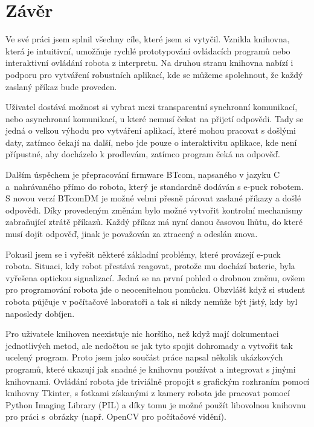 \chapter*{Závěr}

    Ve své práci jsem splnil všechny cíle, které jsem si vytyčil. Vznikla
    knihovna, která je intuitivní, umožňuje rychlé prototypování ovládacích
    programů nebo interaktivní ovládání robota z interpretu. Na druhou stranu
    knihovna nabízí i podporu pro vytváření robustních aplikací, kde se můžeme
    spolehnout, že každý zaslaný příkaz bude proveden.

    Uživatel dostává možnost si vybrat mezi transparentní synchronní
    komunikací, nebo asynchronní komunikací, u které nemusí čekat na přijetí
    odpovědi. Tady se jedná o velkou výhodu pro vytváření aplikací, které mohou
    pracovat s došlými daty, zatímco čekají na další, nebo jde pouze o
    interaktivitu aplikace, kde není přípustné, aby docházelo k prodlevám,
    zatímco program čeká na odpověď.

    Dalším úspěchem je přepracování firmware BTcom, napsaného v jazyku C
    a~nahrávaného přímo do robota, který je standardně dodáván s e-puck
    robotem. S novou verzí BTcomDM je možné velmi přesně párovat zaslané
    příkazy a došlé odpovědi. Díky provedeným změnám bylo možné vytvořit
    kontrolní mechanismy zabraňující ztrátě příkazů. Každý příkaz má nyní danou
    časovou lhůtu, do které musí dojít odpověď, jinak je považován za ztracený
    a odeslán znova.

    Pokusil jsem se i vyřešit některé základní problémy, které provázejí e-puck
    robota. Situaci, kdy robot přestává reagovat, protože mu dochází baterie,
    byla vyřešena optickou signalizací. Jedná se na první pohled o drobnou
    změnu, ovšem pro programování robota jde o neocenitelnou pomůcku. Obzvlášť
    když si student robota půjčuje v počítačové laboratoři a tak si nikdy
    nemůže být jistý, kdy byl naposledy dobíjen.

    Pro uživatele knihoven neexistuje nic horšího, než když mají dokumentaci
    jednotlivých metod, ale nedočtou se jak tyto spojit dohromady a vytvořit
    tak ucelený program. Proto jsem jako součást práce napsal několik
    ukázkových programů, které ukazují jak snadné je knihovnu používat a
    integrovat s jinými knihovnami. Ovládání robota jde triviálně propojit s
    grafickým rozhraním pomocí knihovny Tkinter, s fotkami získanými z kamery
    robota jde pracovat pomocí Python Imaging Library (PIL) a díky tomu je
    možné použít libovolnou knihovnu pro práci s~obrázky (např. OpenCV pro
    počítačové vidění).

